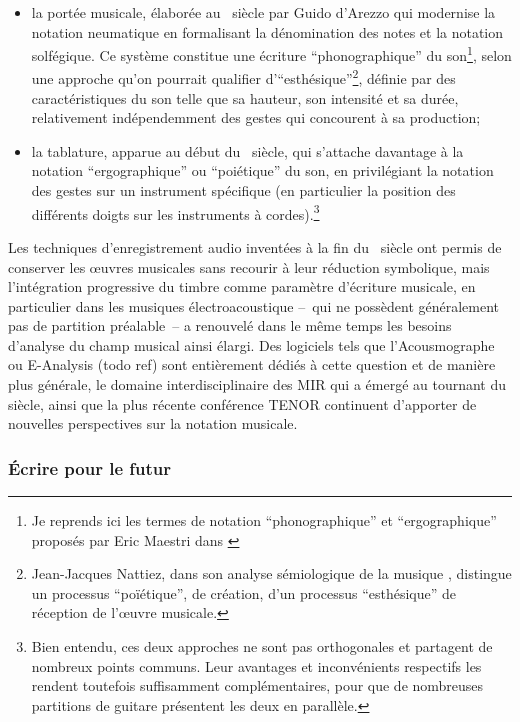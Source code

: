 \begin{itemize}[noitemsep]
	\item la portée musicale, élaborée au ~siècle par Guido d'Arezzo qui modernise la notation neumatique en formalisant la dénomination des notes et la notation solfégique. Ce système constitue une écriture ``phonographique'' du son\footnote{Je reprends ici les termes de notation ``phonographique'' et ``ergographique'' proposés par Eric Maestri dans \cite{maestri_notation_2016}}, selon une approche qu'on pourrait qualifier d'``esthésique''\footnote{Jean-Jacques Nattiez, dans son analyse sémiologique de la musique \cite{nattiez_musicologie_1987}, distingue un processus ``poïétique'', de création, d'un processus ``esthésique'' de réception de l'œuvre musicale.}, définie par des caractéristiques du son telle que sa hauteur, son intensité et sa durée, relativement indépendemment des gestes qui concourent à sa production;
	\item la tablature, apparue au début du ~siècle, qui s'attache davantage à la notation ``ergographique'' ou ``poiétique'' du son, en privilégiant la notation des gestes sur un instrument spécifique (en particulier la position des différents doigts sur les instruments à cordes).\footnote{Bien entendu, ces deux approches ne sont pas orthogonales et partagent de nombreux points communs. Leur avantages et inconvénients respectifs les rendent toutefois suffisamment complémentaires, pour que de nombreuses partitions de guitare présentent les deux en parallèle.}
\end{itemize}

\indent Les techniques d'enregistrement audio inventées à la fin du ~siècle ont permis de conserver les œuvres musicales sans recourir à leur réduction symbolique, mais l'intégration progressive du timbre comme paramètre d'écriture musicale, en particulier dans les musiques électroacoustique --~qui ne possèdent généralement pas de partition préalable~-- a renouvelé dans le même temps les besoins d'analyse du champ musical ainsi élargi. Des logiciels tels que l'Acousmographe ou E-Analysis (todo ref) sont entièrement dédiés à cette question et de manière plus générale, le domaine interdisciplinaire des \gls{MIR} qui a émergé au tournant du siècle, ainsi que la plus récente conférence \gls{TENOR} continuent d'apporter de nouvelles perspectives sur la notation musicale.

\subsubsection{Écrire pour le futur}

